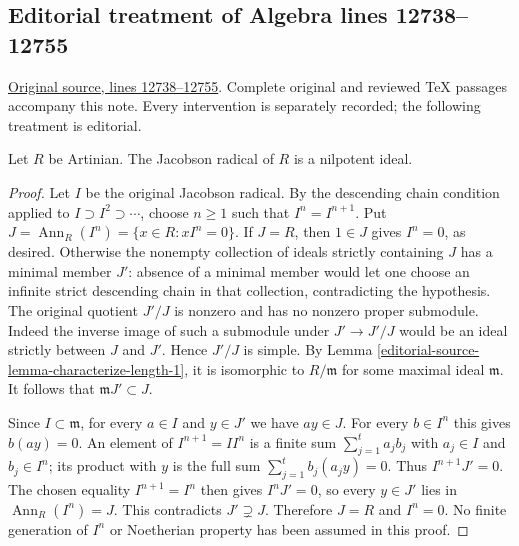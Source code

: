 \subsection{Editorial treatment of Algebra lines 12738--12755}

\hypertarget{algebra-context-168}{}

\noindent\href{https://github.com/stacks/stacks-project/blob/a04446e57ec1fbc252a871afcec7752fb2807b14/algebra.tex\#L12738}{Original source, lines 12738--12755}. Complete original and reviewed TeX passages accompany this note. Every intervention is separately recorded; the following treatment is editorial.


\begin{lemma}
\label{editorial-source-lemma-artinian-radical-nilpotent}
Let $R$ be Artinian. The Jacobson radical of $R$ is a nilpotent ideal.
\end{lemma}

\begin{proof}
Let $I$ be the original Jacobson radical. By the descending
chain condition applied to $I\supset I^2\supset\cdots$,
choose $n\geq1$ such that $I^n=I^{n+1}$.
Put $J=\operatorname{Ann}_R(I^n)=\{x\in R:xI^n=0\}$.
If $J=R$, then $1\in J$ gives $I^n=0$, as desired.
Otherwise the nonempty collection of ideals strictly containing
$J$ has a minimal member $J'$: absence of a minimal member
would let one choose an infinite strict descending chain in that
collection, contradicting the hypothesis.
The original quotient $J'/J$ is nonzero and has no nonzero
proper submodule. Indeed the inverse image of such a submodule
under $J'\to J'/J$ would be an ideal strictly between $J$ and
$J'$. Hence $J'/J$ is simple.
By Lemma \ref{editorial-source-lemma-characterize-length-1}, it is isomorphic
to $R/\mathfrak m$ for some maximal ideal $\mathfrak m$.
It follows that $\mathfrak mJ'\subset J$.

Since $I\subset\mathfrak m$, for every $a\in I$ and $y\in J'$
we have $ay\in J$. For every $b\in I^n$ this gives
$b(ay)=0$. An element of $I^{n+1}=II^n$ is a finite sum
$\sum_{j=1}^t a_jb_j$ with $a_j\in I$ and $b_j\in I^n$;
its product with $y$ is the full sum
$\sum_{j=1}^t b_j(a_jy)=0$.
Thus $I^{n+1}J'=0$. The chosen equality $I^{n+1}=I^n$
then gives $I^nJ'=0$, so every $y\in J'$ lies in
$\operatorname{Ann}_R(I^n)=J$. This contradicts $J'\supsetneq J$.
Therefore $J=R$ and $I^n=0$. No finite generation of $I^n$
or Noetherian property has been assumed in this proof.
\end{proof}


